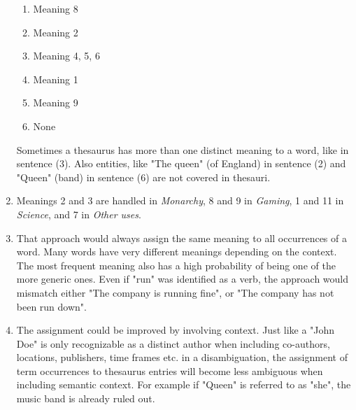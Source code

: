 \documentclass[10pt,a4paper]{article}
\begin{document}
\begin{enumerate}
\begin{enumerate}[label={(\arabic*)}]
            \item Meaning 8
            \item Meaning 2
            \item Meaning 4, 5, 6
            \item Meaning 1
            \item Meaning 9
            \item None
        \end{enumerate}
        Sometimes a thesaurus has more than one distinct meaning to a word, like in sentence (3). Also entities, like "The queen" (of England) in sentence (2) and "Queen" (band) in sentence (6) are not covered in thesauri.
    \item Meanings 2 and 3 are handled in \textit{Monarchy}, 8 and 9 in \textit{Gaming}, 1 and 11 in \textit{Science}, and 7 in \textit{Other uses}.
    \item That approach would always assign the same meaning to all occurrences of a word. Many words have very different meanings depending on the context. The most frequent meaning also has a high probability of being one of the more generic ones. Even if "run" was identified as a verb, the approach would mismatch either "The company is running fine", or "The company has not been run down".
    \item The assignment could be improved by involving context. Just like a "John Doe" is only recognizable as a distinct author when including co-authors, locations, publishers, time frames etc. in a disambiguation, the assignment of term occurrences to thesaurus entries will become less ambiguous when including semantic context. For example if "Queen" is referred to as "she", the music band is already ruled out.
\end{enumerate}


\newpage
\end{document}

